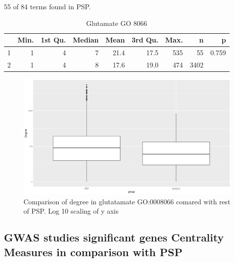 55 of 84 terms found in PSP.

\begin{table}[ht]
\centering
\begin{tabular}{rrrrrrrrr}
  \hline
 & Min. & 1st Qu. & Median & Mean & 3rd Qu. & Max. & n & p \\ 
  \hline
1 & 1 & 4 & 7 & 21.4 & 17.5 & 535 & 55 & 0.759 \\ 
  2 & 1 & 4 & 8 & 17.6 & 19.0 & 474 & 3402 & \\ 
   \hline
\end{tabular}
\caption{Glutamate GO 8066} 
\label{tab:Summary of degree distribution in glutamate receptor compared to the rest of the PSP. p value Wilcoxon test for difference in mean}
\end{table}

\begin{figure}
    \centering
    \includegraphics[width=\textwidth]{images/Rplot_boxplot_group5_degree_PSP.png}
    \caption{Comparison of degree in glutatamate GO:0008066 comared with rest of PSP. Log 10 scaling of y axis}
    \label{fig:comparison of degree glutamate GO:0008066 compared with rest of PSP}
\end{figure}


\subsection{GWAS studies significant genes  Centrality Measures in comparison with PSP}

